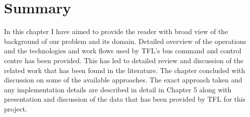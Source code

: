 \section{Summary}
In this chapter I have aimed to provide the reader with broad view of the background of our problem and its domain. Detailed overview of the operations and the technologies and work flows used by TFL's bus command and control centre has been provided. This has led to detailed review and discussion of the related work that has been found in the literature. The chapter concluded with discussion on some of the available approaches. The exact approach taken and any implementation details are described in detail in Chapter 5 along with presentation and discussion of the data that has been provided by TFL for this project.